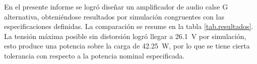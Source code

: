 




	En el presente informe se logró diseñar un amplificador de audio calse G alternativa, obteniéndose resultados por simulación congruentes con las especificaciones definidas. La comparación se resume en la tabla \ref{tab.resultados}. La tensión máxima posible sin distorsión logró llegar a \SI{26.1}{\volt} por simulación, esto produce una potencia sobre la carga de \SI{42.25}{\watt}, por lo que se tiene cierta tolerancia con respecto a la potencia nominal especificada.



